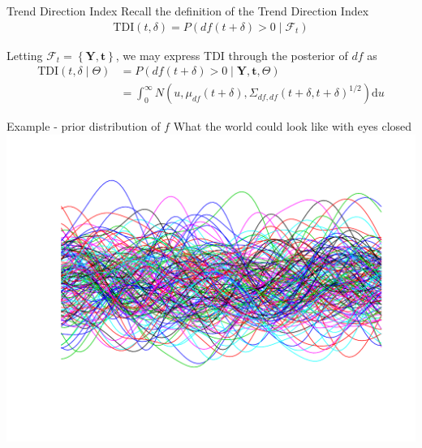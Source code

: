 \documentclass[ignorenonframetext,xcolor=pdflatex,table,dvipsnames,serif]{beamer}
\begin{document}
\begin{frame}{Trend Direction Index}
Recall the definition of the \alert{Trend Direction Index}
\begin{align*}
  \mathrm{TDI}(t, \delta) = P(df(t + \delta) > 0 \mid \mathcal{F}_t)	
\end{align*}

\vspace{0.8cm}

Letting $\mathcal{F}_t = \left\{\mathbf{Y}, \mathbf{t}\right\}$, we may express TDI through the posterior of $df$ as
\begin{align*}
  \mathrm{TDI}(t, \delta \mid \Theta) &= P\left(df(t + \delta) > 0 \mid \mathbf{Y}, \mathbf{t}, \Theta\right)\\
        &= \int_0^\infty N\left(u, \mu_{df}(t + \delta), \Sigma_{df,df}(t + \delta,t + \delta)^{1/2}\right)\mathrm{d}u
\end{align*}
\end{frame}


\begin{frame}{Example - prior distribution of $f$}
  What the world could look like with eyes closed
  \center\includegraphics[scale=0.5]{postAni01}
\end{frame}
\end{document}
